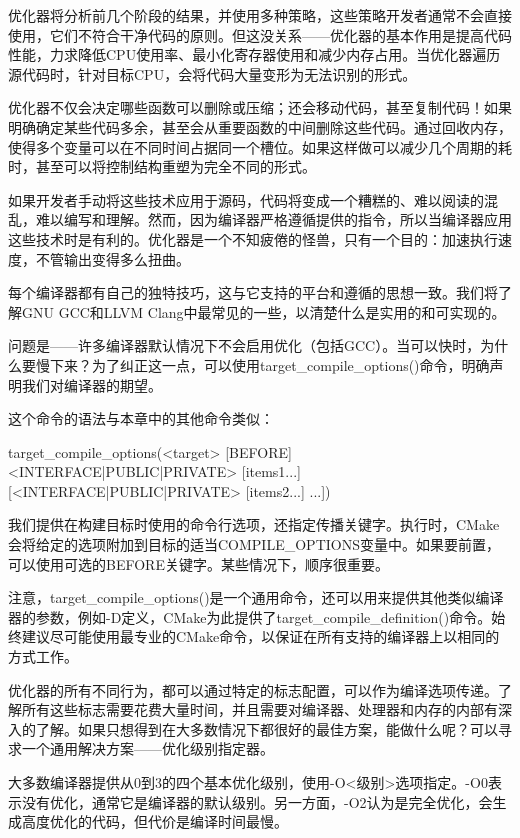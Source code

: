 
优化器将分析前几个阶段的结果，并使用多种策略，这些策略开发者通常不会直接使用，它们不符合干净代码的原则。但这没关系——优化器的基本作用是提高代码性能，力求降低CPU使用率、最小化寄存器使用和减少内存占用。当优化器遍历源代码时，针对目标CPU，会将代码大量变形为无法识别的形式。

优化器不仅会决定哪些函数可以删除或压缩；还会移动代码，甚至复制代码！如果明确确定某些代码多余，甚至会从重要函数的中间删除这些代码。通过回收内存，使得多个变量可以在不同时间占据同一个槽位。如果这样做可以减少几个周期的耗时，甚至可以将控制结构重塑为完全不同的形式。

如果开发者手动将这些技术应用于源码，代码将变成一个糟糕的、难以阅读的混乱，难以编写和理解。然而，因为编译器严格遵循提供的指令，所以当编译器应用这些技术时是有利的。优化器是一个不知疲倦的怪兽，只有一个目的：加速执行速度，不管输出变得多么扭曲。

每个编译器都有自己的独特技巧，这与它支持的平台和遵循的思想一致。我们将了解GNU GCC和LLVM Clang中最常见的一些，以清楚什么是实用的和可实现的。

问题是——许多编译器默认情况下不会启用优化（包括GCC）。当可以快时，为什么要慢下来？为了纠正这一点，可以使用target\_compile\_options()命令，明确声明我们对编译器的期望。

这个命令的语法与本章中的其他命令类似：

\begin{shell}
target_compile_options(<target> [BEFORE]
                       <INTERFACE|PUBLIC|PRIVATE> [items1...]
                      [<INTERFACE|PUBLIC|PRIVATE> [items2...]
...])
\end{shell}

我们提供在构建目标时使用的命令行选项，还指定传播关键字。执行时，CMake会将给定的选项附加到目标的适当COMPILE\_OPTIONS变量中。如果要前置，可以使用可选的BEFORE关键字。某些情况下，顺序很重要。

注意，target\_compile\_options()是一个通用命令，还可以用来提供其他类似编译器的参数，例如-D定义，CMake为此提供了target\_compile\_definition()命令。始终建议尽可能使用最专业的CMake命令，以保证在所有支持的编译器上以相同的方式工作。


优化器的所有不同行为，都可以通过特定的标志配置，可以作为编译选项传递。了解所有这些标志需要花费大量时间，并且需要对编译器、处理器和内存的内部有深入的了解。如果只想得到在大多数情况下都很好的最佳方案，能做什么呢？可以寻求一个通用解决方案——优化级别指定器。

大多数编译器提供从0到3的四个基本优化级别，使用-O<级别>选项指定。-O0表示没有优化，通常它是编译器的默认级别。另一方面，-O2认为是完全优化，会生成高度优化的代码，但代价是编译时间最慢。


